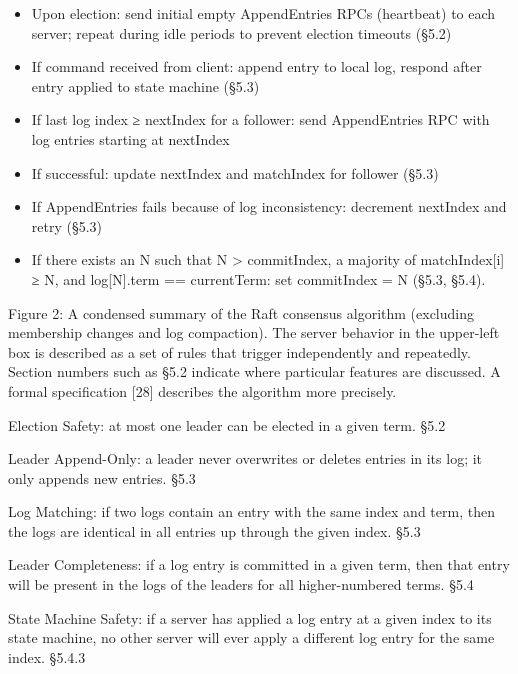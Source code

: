 \documentclass[
]{article}
\providecommand{\tightlist}{%
  \setlength{\itemsep}{0pt}\setlength{\parskip}{0pt}}
\begin{document}
\begin{itemize}
\tightlist
\item
  Upon election: send initial empty AppendEntries RPCs (heartbeat) to
  each server; repeat during idle periods to prevent election timeouts
  (§5.2)\\
\item
  If command received from client: append entry to local log, respond
  after entry applied to state machine (§5.3)\\
\item
  If last log index ≥ nextIndex for a follower: send AppendEntries RPC
  with log entries starting at nextIndex
\item
  If successful: update nextIndex and matchIndex for follower (§5.3)\\
\item
  If AppendEntries fails because of log inconsistency: decrement
  nextIndex and retry (§5.3)\\
\item
  If there exists an N such that N \textgreater{} commitIndex, a
  majority of matchIndex{[}i{]} ≥ N, and log{[}N{]}.term == currentTerm:
  set commitIndex = N (§5.3, §5.4).
\end{itemize}

Figure 2: A condensed summary of the Raft consensus algorithm (excluding
membership changes and log compaction). The server behavior in the
upper-left box is described as a set of rules that trigger independently
and repeatedly. Section numbers such as §5.2 indicate where particular
features are discussed. A formal specification {[}28{]} describes the
algorithm more precisely.

Election Safety: at most one leader can be elected in a given term. §5.2

Leader Append-Only: a leader never overwrites or deletes entries in its
log; it only appends new entries. §5.3

Log Matching: if two logs contain an entry with the same index and term,
then the logs are identical in all entries up through the given index.
§5.3

Leader Completeness: if a log entry is committed in a given term, then
that entry will be present in the logs of the leaders for all
higher-numbered terms. §5.4

State Machine Safety: if a server has applied a log entry at a given
index to its state machine, no other server will ever apply a different
log entry for the same index. §5.4.3
\end{document}
